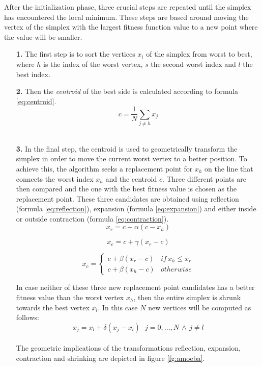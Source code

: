 \documentclass[11pt,a4paper,twoside]{report}
\begin{document}
After the initialization phase, three crucial steps are repeated
until the simplex has encountered the local minimum. These steps are
based around moving the vertex of the simplex with the largest fitness
function value to a new point where the value will be
smaller. 

\begin{enumerate}
\item[\textbf{1.}] The first step is to sort the vertices
$x_{i}$ of the simplex from worst to best, where $h$ is the index
of the worst vertex, $s$ the second worst index and $l$ the best
index.
\item[\textbf{2.}] Then the \textit{centroid} of the best side is calculated according
to formula \ref{eq:centroid}.\\
\begin{equation}\label{eq:centroid}
c=\frac{1}{N}\sum_{j\neq h}x_{j}\end{equation}
\\
\item[\textbf{3.}] In the final step, the centroid is used to geometrically
  transform the simplex in order to move the current worst vertex to
a better position. To achieve this, the algorithm seeks a replacement point for $x_{h}$
on the line that connects the worst index $x_{h}$ and the centroid
$c$. Three different points are then compared and the one with the best fitness
value is chosen as the replacement point. These three candidates are obtained
using reflection (formula \ref{eq:reflection}), expansion (formula
\ref{eq:expansion}) and either inside or outside contraction (formula \ref{eq:contraction}). \\
\begin{equation}\label{eq:reflection}
x_{r}=c+\alpha(c-x_{h})
\end{equation}

\begin{equation}\label{eq:expansion}
x_{e}=c+\gamma(x_{r}-c)
\end{equation}

\begin{equation}\label{eq:contraction}
x_{c}=\begin{cases}
c+\beta(x_{r}-c) & if\, x_{h}\leq x_{r}\\
c+\beta(x_{h}-c) & otherwise\end{cases}
\end{equation}

In case neither of these three new replacement point candidates has
a better fitness value than the worst vertex $x_{h}$, then the entire
simplex is shrunk towards the best vertex $x_{l}$. In this case $N$
new vertices will be computed as follows:\\
\begin{equation}
x_{j}=x_{l}+\delta(x_{j}-x_{l})\,\,\,\, j=0,\ldots,N\,\wedge\, j\neq l\end{equation}
\\
The geometric implications of the transformations reflection, expansion,
contraction and shrinking are depicted in figure \ref{fg:amoeba}. 

\end{enumerate}
\end{document}
